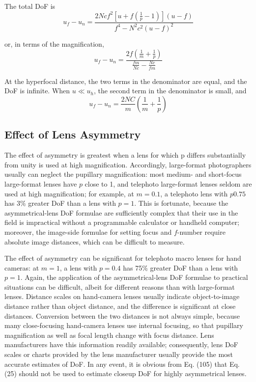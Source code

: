 \documentclass[11pt, oneside]{scrartcl}   	%
\begin{document}
The total DoF is
\begin{equation}
   u_f - u_n = \frac{2Ncf^2\left[u+f\left(\frac 1 p -1 \right)\right](u-f)}{f^4-N^2c^2(u-f)^2}
   \label{eq:totdof}
\end{equation}

or, in terms of the magnification,
\begin{equation}
   u_f - u_n = \frac{2f\left(\frac 1 m + \frac 1 p\right)}{\frac{fm}{Nc}-\frac{Nc}{fm}}
   \label{eq:magdof}
\end{equation}

At the hyperfocal distance, the two terms in the denominator are equal, and the DoF is
 infinite. When $u\ll u_h$, the second term in the denominator is small, and
\begin{equation}
   u_f - u_n = \frac{2NC}{m}\left(\frac 1 m + \frac 1 p\right)
   \label{eq:DOFapprox}
\end{equation}


\subsection{Effect of Lens Asymmetry}

The effect of asymmetry is greatest when a lens for which p differs substantially from unity is used at high magnification. Accordingly, large-format photographers usually can neglect the pupillary magnification: most medium- and short-focus large-format lenses have $p$ close to 1, and telephoto large-format lenses seldom are used at high magnification; for example, at $m = 0.1$, a telephoto lens with $p  0.75$ has 3\% greater DoF than a lens with $p = 1$. This is fortunate, because the asymmetrical-lens DoF formulae are sufficiently complex that their use in the field is impractical without a programmable calculator or handheld computer; moreover, the image-side formulae for setting focus and $f$-number require absolute image distances, which can be difficult to measure.

The effect of asymmetry can be significant for telephoto macro lenses for hand cameras: at $m = 1$, a lens with $p = 0.4$ has 75\% greater DoF than a lens with $p = 1$. Again, the application of the asymmetrical-lens DoF formulae to practical situations can be difficult, albeit for different reasons than with large-format lenses. Distance scales on hand-camera lenses usually indicate object-to-image distance rather than object distance, and the difference is significant at close distances. Conversion between the two distances is not always simple, because many close-focusing hand-camera lenses use internal focusing, so that pupillary magnification as well as focal length change with focus distance. Lens manufacturers have this information readily available; consequently, lens DoF scales or charts provided by the lens manufacturer usually provide the most accurate estimates of DoF. In any event, it is obvious from Eq. (105) that Eq. (25) should not be used to estimate closeup DoF for highly asymmetrical lenses.
\end{document}
